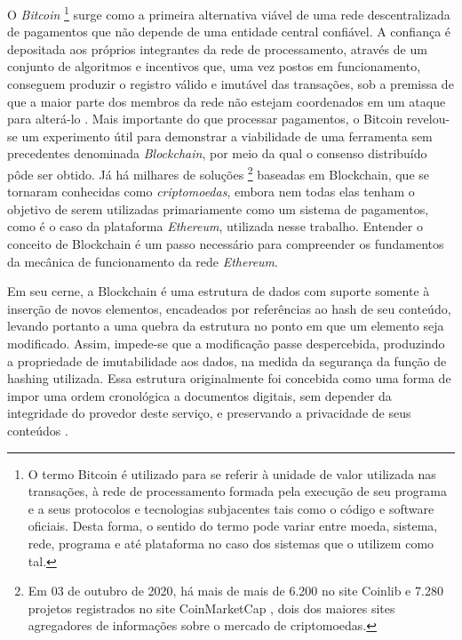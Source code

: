 \documentclass[a4paper,11pt]{article}
\begin{document}
O \emph{Bitcoin}
\footnote{O termo Bitcoin é utilizado para se referir à unidade de valor utilizada nas transações, à rede de processamento formada pela execução de seu programa e a seus protocolos e tecnologias subjacentes tais como o código e software oficiais.
Desta forma, o sentido do termo pode variar entre moeda, sistema, rede, programa e até plataforma no caso dos sistemas que o utilizem como tal.}
surge como a primeira alternativa viável de uma rede descentralizada de pagamentos que não depende de uma entidade central confiável.
A confiança é depositada aos próprios integrantes da rede de processamento, através de um conjunto de algoritmos e incentivos que, uma vez postos em funcionamento, conseguem produzir o registro válido e imutável das transações, sob a premissa de que a maior parte dos membros da rede não estejam coordenados em um ataque para alterá-lo \cite{nakamoto2008bitcoin}.
Mais importante do que processar pagamentos, o Bitcoin revelou-se um experimento útil para demonstrar a viabilidade de uma ferramenta sem precedentes denominada \emph{Blockchain}, por meio da qual o consenso distribuído pôde ser obtido.
Já há milhares de soluções
\footnote{Em 03 de outubro de 2020, há mais de mais de 6.200 no site Coinlib e 7.280 projetos registrados no site CoinMarketCap \cite{CoinMarketCap2020, Coinlib2020}, dois dos maiores sites agregadores de informações sobre o mercado de criptomoedas.}
baseadas em Blockchain, que se tornaram conhecidas como \emph{criptomoedas}, embora nem todas elas tenham o objetivo de serem utilizadas primariamente como um sistema de pagamentos, como é o caso da plataforma \emph{Ethereum}, utilizada nesse trabalho.
Entender o conceito de Blockchain é um passo necessário para compreender os fundamentos da mecânica de funcionamento da rede \emph{Ethereum}.


Em seu cerne, a Blockchain é uma estrutura de dados com suporte somente à inserção de novos elementos, encadeados por referências ao hash de seu conteúdo, levando portanto a uma quebra da estrutura no ponto em que um elemento seja modificado. Assim, impede-se que a modificação passe despercebida, produzindo a propriedade de imutabilidade aos dados, na medida da segurança da função de hashing utilizada.
Essa estrutura originalmente foi concebida como uma forma de impor uma ordem cronológica a documentos digitais, sem depender da integridade do provedor deste serviço, e preservando a privacidade de seus conteúdos \cite{Haber1991}.
\end{document}
